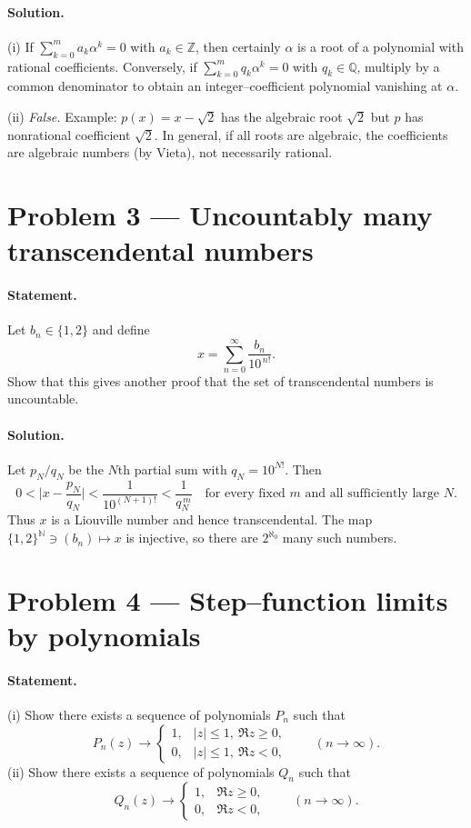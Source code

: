 \documentclass[12pt,a4paper]{article}
\theoremstyle{plain}
\theoremstyle{definition}
\theoremstyle{remark}
\theoremstyle{remark}
\begin{document}
\paragraph{Solution.}
(i) If $\sum_{k=0}^m a_k\alpha^k=0$ with $a_k\in\mathbb Z$, then certainly $\alpha$ is a root of a polynomial with rational coefficients. Conversely, if $\sum_{k=0}^m q_k\alpha^k=0$ with $q_k\in\mathbb Q$, multiply by a common denominator to obtain an integer–coefficient polynomial vanishing at $\alpha$.

(ii) \emph{False.} Example: $p(x)=x-\sqrt2$ has the algebraic root $\sqrt2$ but $p$ has nonrational coefficient $\sqrt2$. In general, if all roots are algebraic, the coefficients are algebraic numbers (by Vieta), not necessarily rational.

\bigskip
\section*{Problem 3 — Uncountably many transcendental numbers}

\paragraph{Statement.}
Let $b_n\in\{1,2\}$ and define
\[
x=\sum_{n=0}^{\infty}\frac{b_n}{10^{\,n!}}.
\]
Show that this gives another proof that the set of transcendental numbers is uncountable.

\paragraph{Solution.}
Let $p_N/q_N$ be the $N$th partial sum with $q_N=10^{N!}$. Then
\[
0<\Big|x-\frac{p_N}{q_N}\Big|<\frac{1}{10^{(N+1)!}}<\frac{1}{q_N^{\,m}}
\quad\text{for every fixed }m\text{ and all sufficiently large }N.
\]
Thus $x$ is a Liouville number and hence transcendental. The map
$\{1,2\}^{\mathbb N}\ni(b_n)\mapsto x$ is injective, so there are $2^{\aleph_0}$ many such numbers.

\bigskip
\section*{Problem 4 — Step–function limits by polynomials}

\paragraph{Statement.}
(i) Show there exists a sequence of polynomials $P_n$ such that
\[
P_n(z)\to
\begin{cases}
	1,& |z|\le1,\ \Re z\ge0,\\
	0,& |z|\le1,\ \Re z<0,
\end{cases}
\qquad(n\to\infty).
\]
(ii) Show there exists a sequence of polynomials $Q_n$ such that
\[
Q_n(z)\to
\begin{cases}
	1,& \Re z\ge0,\\
	0,& \Re z<0,
\end{cases}
\qquad(n\to\infty).
\]
\end{document}

